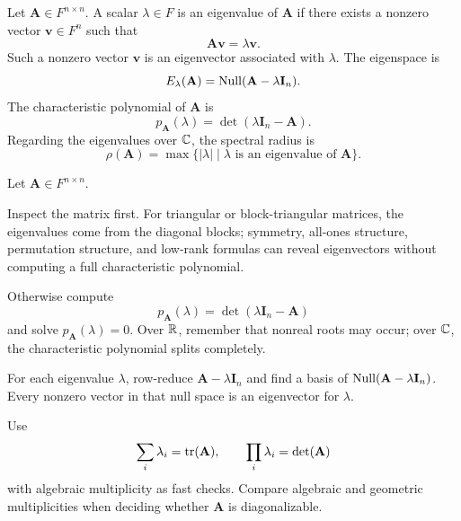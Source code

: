     \begin{definition}
        Let $\mathbf{A}\in F^{n\times n}$. A scalar $\lambda\in F$ is an
        eigenvalue of $\mathbf{A}$ if there exists a nonzero vector
        $\mathbf{v}\in F^n$ such that
        \[
            \mathbf{A}\mathbf{v}=\lambda\mathbf{v}.
        \]
        Such a nonzero vector $\mathbf{v}$ is an eigenvector associated with
        $\lambda$. The eigenspace is
        \[
            E_\lambda(\mathbf{A})
            =
            \operatorname{Null}(\mathbf{A}-\lambda\mathbf{I}_n).
        \]
        The characteristic polynomial of $\mathbf{A}$ is
        \[
            p_{\mathbf{A}}(\lambda)
            =
            \det(\lambda\mathbf{I}_n-\mathbf{A}).
        \]
        Regarding the eigenvalues over $\mathbb{C}$, the spectral radius is
        \[
            \rho(\mathbf{A})
            =
            \max\{\lvert\lambda\rvert\mid\lambda\text{ is an eigenvalue of }\mathbf{A}\}.
        \]
    \end{definition}


    \begin{algorithm}
        Let $\mathbf{A}\in F^{n\times n}$.
        \begin{bookitems}
            \item Inspect the matrix first. For triangular or block-triangular
                  matrices, the eigenvalues come from the diagonal blocks;
                  symmetry, all-ones structure, permutation structure, and
                  low-rank formulas can reveal eigenvectors without computing a
                  full characteristic polynomial.
            \item Otherwise compute
                  \[
                      p_{\mathbf{A}}(\lambda)
                      =\det(\lambda\mathbf{I}_n-\mathbf{A})
                  \]
                  and solve $p_{\mathbf{A}}(\lambda)=0$. Over $\mathbb{R}$, remember
                  that nonreal roots may occur; over $\mathbb{C}$, the characteristic
                  polynomial splits completely.
            \item For each eigenvalue $\lambda$, row-reduce
                  $\mathbf{A}-\lambda\mathbf{I}_n$ and find a basis of
                  $\operatorname{Null}(\mathbf{A}-\lambda\mathbf{I}_n)$. Every nonzero vector
                  in that null space is an eigenvector for $\lambda$.
            \item Use
                  \[
                      \sum_i\lambda_i=\operatorname{tr}(\mathbf{A}),
                      \qquad
                      \prod_i\lambda_i=\det(\mathbf{A})
                  \]
                  with algebraic multiplicity as fast checks. Compare algebraic
                  and geometric multiplicities when deciding whether
                  $\mathbf{A}$ is diagonalizable.
        \end{bookitems}
    \end{algorithm}

